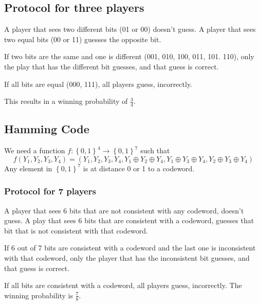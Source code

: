 \documentclass{article}
\begin{document}
\subsection{Protocol for three players}

A player that sees two different bits (01 or 00) doesn't guess. A player that sees two equal bits (00 or 11) guesses the opposite bit.

If two bits are the same and one is different (001, 010, 100, 011, 101. 110), only the play that has the different bit guesses, and that guess is correct.

If all bits are equal (000, 111), all players guess, incorrectly.

This results in a winning probability of $\frac{3}{4}$.

\subsection{Hamming Code}

We need a function $f:\left\{0,1\right\}^4 \to \left\{0,1\right\}^7$ such that
\[
f(Y_1,Y_2,Y_3,Y_4) = \left(Y_1, Y_2, Y_3, Y_4, Y_1\oplus Y_2\oplus Y_4, Y_1\oplus Y_3\oplus Y_4, Y_2\oplus Y_3\oplus Y_4\right)
\]
Any element in $\left\{0,1\right\}^7$ is at distance 0 or 1 to a codeword.

\subsubsection{Protocol for 7 players}

A player that sees 6 bits that are not consistent with any codeword, doesn't guess. A play that sees 6 bits that are consistent with a codeword, guesses that bit that is not consistent with that codeword.

If 6 out of 7 bits are consistent with a codeword and the last one is inconsistent with that codeword, only the player that has the inconsistent bit guesses, and that guess is correct.

If all bits are consistent with a codeword, all players guess, incorrectly. The winning probability is $\frac{7}{8}$.
\end{document}
